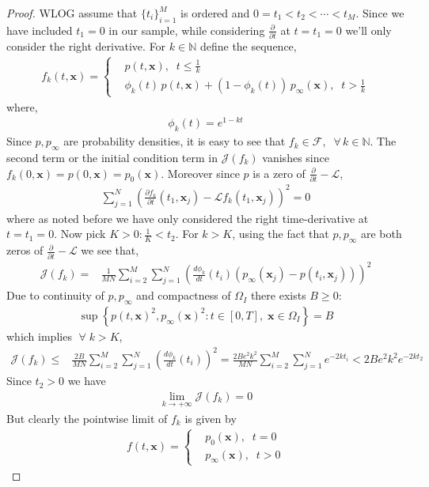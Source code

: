 \begin{proof}
WLOG assume that $\{t_i\}_{i=1}^M$ is ordered and $0=t_1<t_2<\cdots<t_M$. Since we have included $t_1=0$ in our sample, while considering $\frac{\partial}{\partial t}$ at $t=t_1=0$ we'll only consider the right derivative.
For $k\in\mathbb N$ define the sequence,
\begin{align}
    f_{k}(t, \mathbf x) =\begin{cases}
    &p(t,\mathbf x),\;\;t\le\frac{1}{k}\\
    &\phi_k(t)\,p(t, \mathbf x) + (1-\phi_{k}(t))\,p_\infty(\mathbf x),\;\; t>\frac{1}{k}
    \end{cases}
\end{align}
where,
\begin{align}
    \phi_{k}(t) = e^{1-kt}
\end{align}
Since $p,p_\infty$ are probability densities, it is easy to see that  $f_k\in\mathcal F,\;\;\forall\, k\in\mathbb N$.
The second term or the initial condition term in $\mathcal J(f_k)$ vanishes since $f_k(0,\mathbf x)=p(0,\mathbf x)=p_0(\mathbf x)$. Moreover since $p$ is a zero of $\frac{\partial}{\partial t}-\mathcal{L}$, 
\begin{align}
    \sum_{j=1}^N\left(\frac{\partial f_k}{\partial t}(t_1, \mathbf x_j)-\mathcal Lf_k(t_1, \mathbf x_j)\right)^2 =0
\end{align}
where as noted before we have only considered the right time-derivative at  $t=t_1=0$. Now pick $K>0:\frac{1}{K}<t_2$. For $k>K$, using the fact that $p, p_\infty$ are both zeros of $\frac{\partial}{\partial t}-\mathcal{L}$ we see that,
\begin{align}
    \mathcal J(f_{k})=&\frac{1}{MN}\sum_{i=2}^M\sum_{j=1}^N\left(\frac{d \phi_k}{d t}(t_i)(p_\infty(\mathbf x_j)-p(t_i, \mathbf x_j))\right)^2
\end{align}
Due to continuity of $p,p_\infty$ and compactness of $\Omega_I$ there exists $B\ge0:$ 
    \begin{align}
        \sup\left\{p(t, \mathbf x)^2, p_\infty(\mathbf x)^2 :t\in[0, T],\;\mathbf x\in\Omega_I\right\}= B
    \end{align}
which implies $\;\forall\;k>K$,
\begin{align}
    \mathcal{J}(f_k)\le&\frac{2B}{MN}\sum_{i=2}^M\sum_{j=1}^N\left(\frac{d \phi_k}{d t}(t_i)\right)^2=\frac{2Be^2k^2}{MN}\sum_{i=2}^M\sum_{j=1}^Ne^{-2kt_i}
<{2Be^2k^2}e^{-2kt_2}
\end{align}
Since $t_2>0$ we have
\begin{align}
    \lim_{k\to+\infty}\mathcal J(f_k)=0
\end{align}
But clearly the pointwise limit of $f_k$ is given by
\begin{align}
    f(t, \mathbf x) =\begin{cases}
    &p_0(\mathbf x),\;\;t=0\\
    &p_\infty(\mathbf x),\;\; t>0
    \end{cases}\label{eq:limit-min-seq--dynamic-fp}
\end{align}
\end{proof}
